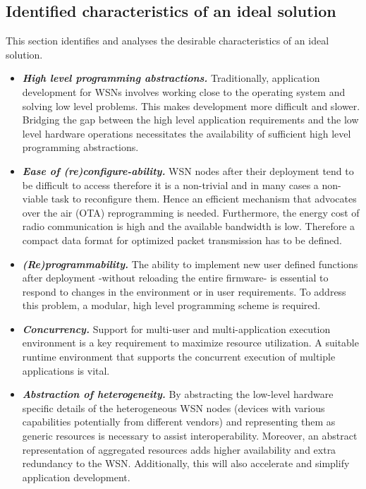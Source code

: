 \subsection{Identified characteristics of an ideal solution}
This section identifies and analyses the desirable characteristics of an ideal solution.
\begin{itemize}
	\item \textbf{\emph{High level programming abstractions.}} Traditionally, application development for WSNs involves working close to the operating system and solving low level problems. This makes development more difficult and slower. Bridging the gap between the high level application requirements and the low level hardware operations necessitates the availability of sufficient high level programming abstractions.
	
	\item \textbf{\emph{Ease of (re)configure-ability.}} WSN nodes after their deployment tend to be difficult to access therefore it is a non-trivial and in many cases a non-viable task to reconfigure them. Hence an efficient mechanism that advocates over the air (OTA) reprogramming is needed. Furthermore, the energy cost of radio communication is high and the available bandwidth is low. Therefore a compact data format for optimized packet transmission has to be defined.
	
	\item \textbf{\emph{(Re)programmability.}} The ability to implement new user defined functions after deployment -without reloading the entire firmware- is essential to respond to changes in the environment or in user requirements. To address this problem, a modular, high level programming scheme is required.   
	
	\item \textbf{\emph{Concurrency.}} Support for multi-user and multi-application execution environment is a key requirement to maximize resource utilization. A suitable runtime environment that supports the concurrent execution of multiple applications is vital.
	
	\item \textbf{\emph{Abstraction of heterogeneity.}} By abstracting the low-level hardware specific details of the heterogeneous WSN nodes (devices with various capabilities potentially from different vendors) and representing them as generic resources is necessary to assist interoperability. Moreover, an abstract representation of aggregated resources adds higher availability and extra redundancy to the WSN. Additionally, this will also accelerate and simplify application development.
	

\end{itemize}
